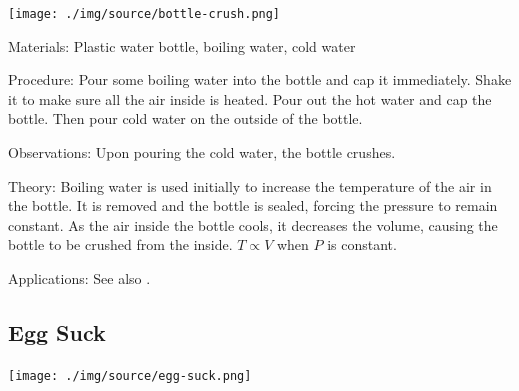 \begin{multicols}{2}
\begin{center}
\texttt{[image: ./img/source/bottle-crush.png]}
\end{center}

\begin{description*}
\item[Materials:]{Plastic water bottle, boiling water, cold water}
\item[Procedure:]{Pour some boiling water into the bottle and cap it immediately. Shake it to make sure all the air inside is heated. Pour out the hot water and cap the bottle. Then pour cold water on the outside of the bottle.}
\item[Observations:]{Upon pouring the cold water, the bottle crushes.}
\item[Theory:]{Boiling water is used initially to increase the temperature of the air in the bottle. It is removed and the bottle is sealed, forcing the pressure to remain constant. As the air inside the bottle cools, it decreases the volume, causing the bottle to be crushed from the inside. $T \propto V$ when $P$ is constant.}
\item[Applications:]{See also .}
\end{description*}

\subsection{Egg Suck}

\begin{center}
\texttt{[image: ./img/source/egg-suck.png]}
\end{center}


\end{multicols}
